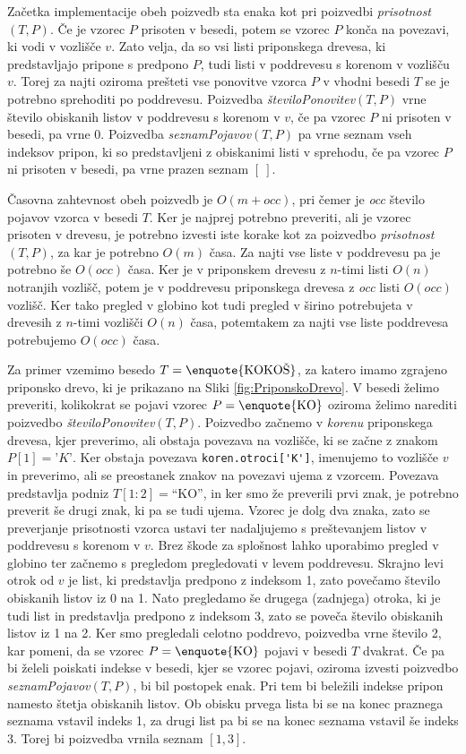 Začetka implementacije obeh poizvedb sta enaka kot pri poizvedbi \textit{prisotnost}$(T,P)$. Če je vzorec $P$ prisoten v besedi, potem se vzorec $P$ konča na povezavi, ki vodi v vozlišče $v$. Zato velja, da so vsi listi priponskega drevesa, ki predstavljajo pripone s predpono $P$, tudi listi v poddrevesu s korenom v vozlišču $v$. Torej za najti oziroma prešteti vse ponovitve vzorca $P$ v vhodni besedi $T$ se je potrebno sprehoditi po poddrevesu. Poizvedba \textit{številoPonovitev}$(T,P)$ vrne število obiskanih listov v poddrevesu s korenom v $v$, če pa vzorec $P$ ni prisoten v besedi, pa vrne $0$. Poizvedba \textit{seznamPojavov}$(T,P)$ pa vrne seznam vseh indeksov pripon, ki so predstavljeni z obiskanimi listi v sprehodu, če pa vzorec $P$ ni prisoten v besedi, pa vrne prazen seznam $[~]$.

Časovna zahtevnost obeh poizvedb je $O(m+\textit{occ})$, pri čemer je \textit{occ} število pojavov vzorca v besedi $T$. Ker je najprej potrebno preveriti, ali je vzorec prisoten v drevesu, je potrebno izvesti iste korake kot za poizvedbo \textit{prisotnost}$(T,P)$, za kar je potrebno $O(m)$ časa. Za najti vse liste v poddrevesu pa je potrebno še $O(\textit{occ})$ časa. Ker je v priponskem drevesu z $n$-timi listi $O(n)$ notranjih vozlišč, potem je v poddrevesu priponskega drevesa z \textit{occ} listi $O(\textit{occ})$ vozlišč. Ker tako pregled v globino kot tudi pregled v širino potrebujeta v drevesih z $n$-timi vozlišči $O(n)$ časa, potemtakem za najti vse liste poddrevesa potrebujemo $O(\textit{occ})$ časa.

Za primer vzemimo besedo $T=\text{\enquote{KOKOŠ}}$, za katero imamo zgrajeno priponsko drevo, ki je prikazano na Sliki \ref{fig:PriponskoDrevo}. V besedi želimo preveriti, kolikokrat se pojavi vzorec $P=\text{\enquote{KO}}$ oziroma želimo narediti poizvedbo \textit{številoPonovitev}$(T,P)$. Poizvedbo začnemo v \textit{korenu} priponskega drevesa, kjer preverimo, ali obstaja povezava na vozlišče, ki se začne z znakom $P[1]=\textit{'K'}$. Ker obstaja povezava \verb|koren.otroci['K']|, imenujemo to vozlišče $v$ in preverimo, ali se preostanek znakov na povezavi ujema z vzorcem. Povezava predstavlja podniz $T[1:2]=$\enquote{KO}, in ker smo že preverili prvi znak, je potrebno preverit še drugi znak, ki pa se tudi ujema. Vzorec je dolg dva znaka, zato se preverjanje prisotnosti vzorca ustavi ter nadaljujemo s preštevanjem listov v poddrevesu s korenom v $v$. Brez škode za splošnost lahko uporabimo pregled v globino ter začnemo s pregledom pregledovati v levem poddrevesu. Skrajno levi otrok od $v$ je list, ki predstavlja predpono z indeksom 1, zato povečamo število obiskanih listov iz 0 na 1. Nato pregledamo še drugega (zadnjega) otroka, ki je tudi list in predstavlja predpono z indeksom 3, zato se poveča število obiskanih listov iz 1 na 2. Ker smo pregledali celotno poddrevo, poizvedba vrne število 2, kar pomeni, da se vzorec $P=\text{\enquote{KO}}$ pojavi v besedi $T$ dvakrat. Če pa bi želeli poiskati indekse v besedi, kjer se vzorec pojavi, oziroma izvesti poizvedbo \textit{seznamPojavov}$(T,P)$, bi bil postopek enak. Pri tem bi beležili indekse pripon namesto štetja obiskanih listov. Ob obisku prvega lista bi se na konec praznega seznama vstavil indeks 1, za drugi list pa bi se na konec seznama vstavil še indeks 3. Torej bi poizvedba vrnila seznam $[1,3]$.